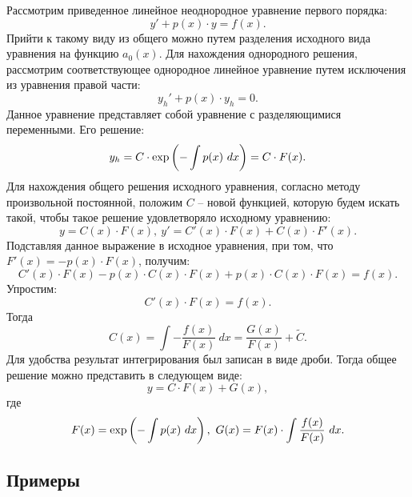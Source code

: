	Рассмотрим приведенное линейное неоднородное уравнение первого порядка:
	\[ y' + p(x) \cdot y = f(x). \]
	Прийти к такому виду из общего можно путем разделения исходного вида уравнения на функцию $a_0(x)$. Для нахождения однородного решения, рассмотрим соответствующее однородное линейное уравнение путем исключения из уравнения правой части:
	\[ y_h' + p(x) \cdot y_h = 0. \]
	Данное уравнение представляет собой уравнение с разделяющимися переменными. Его решение:
	\[ y_h = C \cdot \exp\left( - \int p(x) ~ dx \right) = C \cdot F(x). \]
	Для нахождения общего решения исходного уравнения, согласно методу произвольной постоянной, положим $C$ -- новой функцией, которую будем искать такой, чтобы такое решение удовлетворяло исходному уравнению:
	\[ y = C(x) \cdot F(x), ~ y' = C'(x) \cdot F(x) + C(x) \cdot F'(x). \]
	Подставляя данное выражение в исходное уравнения, при том, что $F'(x) = -p(x) \cdot F(x)$, получим:
	\[ C'(x) \cdot F(x) - p(x) \cdot C(x) \cdot F(x) + p(x) \cdot C(x) \cdot F(x) = f(x). \]
	Упростим:
	\[ C'(x) \cdot F(x) = f(x). \]
	Тогда
	\[ C(x) = \int -\frac{f(x)}{F(x)} ~ dx = \frac{G(x)}{F(x)} + \tilde{C}. \]
	Для удобства результат интегрирования был записан в виде дроби. Тогда общее решение можно представить в следующем виде:
	\[ y = C \cdot F(x) + G(x), \]
	где
	\[ F(x) = \exp\left( -\int p(x) ~ dx \right), ~ G(x) = F(x) \cdot \int \frac{f(x)}{F(x)} ~ dx.\]

	\subsection{Примеры}

